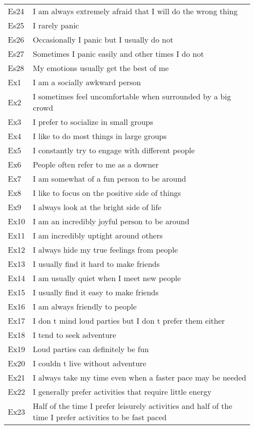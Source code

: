 \documentclass[english,man]{apa6}
\theoremstyle{definition}
\theoremstyle{definition}
\theoremstyle{remark}
\begin{document}
\begin{longtable}{ll}
\addlinespace
Es24 & I am always extremely afraid that I will do the wrong thing\\
Es25 & I rarely panic\\
Es26 & Occasionally I panic  but I usually do not\\
Es27 & Sometimes I panic easily  and other times I do not\\
Es28 & My emotions usually get the best of me\\
\addlinespace
Ex1 & I am a socially awkward person\\
Ex2 & I sometimes feel uncomfortable when surrounded by a big crowd\\
Ex3 & I prefer to socialize in small groups\\
Ex4 & I like to do most things in large groups\\
Ex5 & I constantly try to engage with different people\\
\addlinespace
Ex6 & People often refer to me as a  downer\\
Ex7 & I am somewhat of a fun person to be around\\
Ex8 & I like to focus on the positive side of things\\
Ex9 & I always look at the bright side of life\\
Ex10 & I am an incredibly joyful person to be around\\
\addlinespace
Ex11 & I am incredibly uptight around others\\
Ex12 & I always hide my true feelings from people\\
Ex13 & I usually find it hard to make friends\\
Ex14 & I am usually quiet when I meet new people\\
Ex15 & I usually find it easy to make friends\\
\addlinespace
Ex16 & I am always friendly to people\\
Ex17 & I don t mind loud parties  but I don t prefer them either\\
Ex18 & I tend to seek adventure\\
Ex19 & Loud parties can definitely be fun\\
Ex20 & I couldn t live without adventure\\
\addlinespace
Ex21 & I always take my time   even when a faster pace may be needed\\
Ex22 & I generally prefer activities that require little energy\\
Ex23 & Half of the time I prefer leisurely activities and half of the time I prefer activities to be fast paced\\

\end{longtable}
\end{document}
